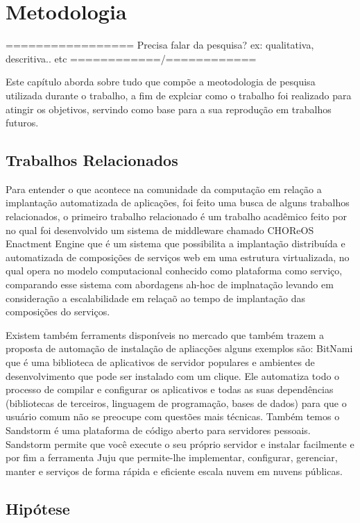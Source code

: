 \chapter{Metodologia}
\label{cap-metodologia}

================= Precisa falar da pesquisa? ex: qualitativa, descritiva.. etc ============/============

Este capítulo aborda sobre tudo que compõe a meotodologia de pesquisa utilizada
durante o trabalho, a fim de explciar como o trabalho foi realizado para atingir os
objetivos, servindo como base para a sua reprodução em trabalhos futuros.

\section{Trabalhos Relacionados}

Para entender o que acontece na comunidade da computação em relação a implantação
automatizada de aplicações, foi feito uma busca de alguns trabalhos relacionados, o primeiro
trabalho relacionado é um trabalho acadêmico feito por \cite{leo2014} no qual foi
desenvolvido um sistema de middleware chamado CHOReOS Enactment Engine que é um
sistema que possibilita a implantação distribuída e automatizada de composições
de serviços web em uma estrutura virtualizada, no qual opera no modelo
computacional conhecido como plataforma como serviço, comparando esse sistema
com abordagens ah-hoc de implnatação levando em consideração a escalabilidade
em relaçaõ ao tempo de implantação das composições do serviços.

Existem também ferraments disponíveis no mercado que também trazem a proposta de automação de
instalação de apliacções alguns exemplos são: \cite{bitnami} BitNami que é uma
biblioteca de aplicativos de servidor populares e ambientes de desenvolvimento que pode ser instalado
com um clique. Ele automatiza todo o processo de  compilar e configurar os
 aplicativos e todas as suas dependências (bibliotecas de terceiros,
linguagem de programação, bases de dados) para que o usuário comum não
se preocupe com questões mais técnicas. Também temos o \cite{standstormio}
Sandstorm é uma plataforma de código aberto para servidores pessoais.
Sandstorm permite que você execute o seu próprio
servidor e instalar facilmente e por fim a ferramenta \cite{juju} Juju que permite-lhe implementar,
configurar, gerenciar, manter e serviços de forma rápida e eficiente escala nuvem
em nuvens públicas.

\section{Hipótese}

